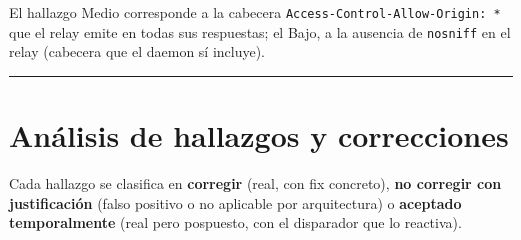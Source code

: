 \documentclass[11pt]{article}
\newcommand{\regla}{\noindent\textcolor{linea}{\rule{\linewidth}{0.4pt}}}
\begin{document}
\medskip
\noindent El hallazgo Medio corresponde a la cabecera \texttt{Access-Control-Allow-Origin: *}
que el relay emite en todas sus respuestas; el Bajo, a la ausencia de
\texttt{nosniff} en el relay (cabecera que el daemon sí incluye).

\regla
\newpage

\section{Análisis de hallazgos y correcciones}
Cada hallazgo se clasifica en \textbf{corregir} (real, con fix concreto),
\textbf{no corregir con justificación} (falso positivo o no aplicable por
arquitectura) o \textbf{aceptado temporalmente} (real pero pospuesto, con el
disparador que lo reactiva).
\end{document}
